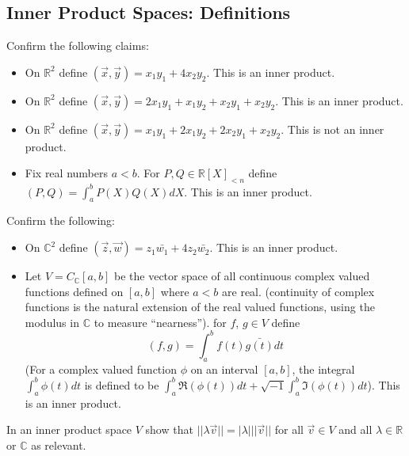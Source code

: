 \subsection{Inner Product Spaces: Definitions}
\item Confirm the following claims:
  \begin{itemize}
  \item On $\mathbb{R}^2$ define $(\vec{x}, \vec{y}) = x_1y_1 + 4x_2y_2$. This is an inner product.
  \item On $\mathbb{R}^2$ define $(\vec{x}, \vec{y}) = 2x_1y_1 + x_1y_2 + x_2y_1 + x_2y_2$. This is an inner product.
  \item On $\mathbb{R}^2$ define $(\vec{x}, \vec{y}) = x_1y_1 + 2x_1y_2 + 2x_2y_1 + x_2y_2$. This is not an inner product.
  \item Fix real numbers $a < b$. For $P, Q \in \mathbb{R}[X]_{< n}$ define $(P, Q) = \int_a^b P(X)Q(X)dX$. This is an inner product.
  \end{itemize}
  
\item Confirm the following:
  \begin{itemize}
  \item On $\mathbb{C}^2$ define $(\vec{z}, \vec{w}) = z_1\bar{w_1} + 4z_2\bar{w_2}$. This is an inner product.
  \item Let $V = C_{\mathbb{C}}[a, b]$ be the vector space of all continuous complex valued functions defined on $[a, b]$ where $a < b$ are real. (continuity of complex functions is the natural extension of the real valued functions, using the modulus in $\mathbb{C}$ to measure ``nearness''). for $f$, $g \in V$ define
    \[
      (f, g) = \int_a^b f(t)\bar{g(t)}dt
    \]
    (For a complex valued function $\phi$ on an interval $[a, b]$, the integral $\int_a^b\phi(t)dt$ is defined to be $\int_a^b \Re(\phi(t))dt + \sqrt{-1}\int_a^b \Im(\phi(t))dt$). This is an inner product.
  \end{itemize}

\item In an inner product space $V$ show that $||\lambda \vec{v}|| = |\lambda|||\vec{v}||$ for all $\vec{v} \in V$ and all $\lambda \in \mathbb{R}$ or $\mathbb{C}$ as relevant.
